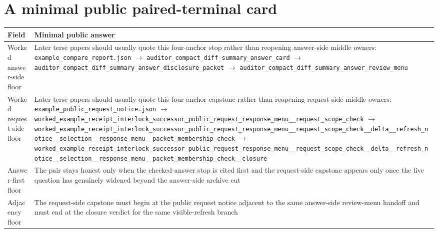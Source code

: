 \documentclass[11pt]{article}
\begin{document}
\section{A minimal public paired-terminal card}
\begin{table}[t]
\centering
\small
\begin{tabularx}{\linewidth}{@{}LY@{}}
\toprule
Field & Minimal public answer \\
\midrule
Worked answer-side floor & Later terse papers should usually quote this four-anchor stop rather than reopening answer-side middle owners:\newline
\texttt{\nolinkurl{example_compare_report.json}}\newline
$\to$\newline
\texttt{\nolinkurl{auditor_compact_diff_summary_answer_card}}\newline
$\to$\newline
\texttt{\nolinkurl{auditor_compact_diff_summary_answer_disclosure_packet}}\newline
$\to$\newline
\texttt{\nolinkurl{auditor_compact_diff_summary_answer_review_menu}} \\
Worked request-side floor & Later terse papers should usually quote this four-anchor capstone rather than reopening request-side middle owners:\newline
\texttt{\nolinkurl{example_public_request_notice.json}}\newline
$\to$\newline
\texttt{\nolinkurl{worked_example_receipt_interlock_successor_public_request_response_menu__request_scope_check}}\newline
$\to$\newline
\texttt{\nolinkurl{worked_example_receipt_interlock_successor_public_request_response_menu__request_scope_check__delta__refresh_notice__selection__response_menu__packet_membership_check}}\newline
$\to$\newline
\texttt{\nolinkurl{worked_example_receipt_interlock_successor_public_request_response_menu__request_scope_check__delta__refresh_notice__selection__response_menu__packet_membership_check__closure}} \\
Answer-first floor & The pair stays honest only when the checked-answer stop is cited first and the request-side capstone appears only once the live question has genuinely widened beyond the answer-side archive cut \\
Adjacency floor & The request-side capstone must begin at the public request notice adjacent to the same answer-side review-menu handoff and must end at the closure verdict for the same visible-refresh branch \\

\end{tabularx}
\end{table}
\end{document}
